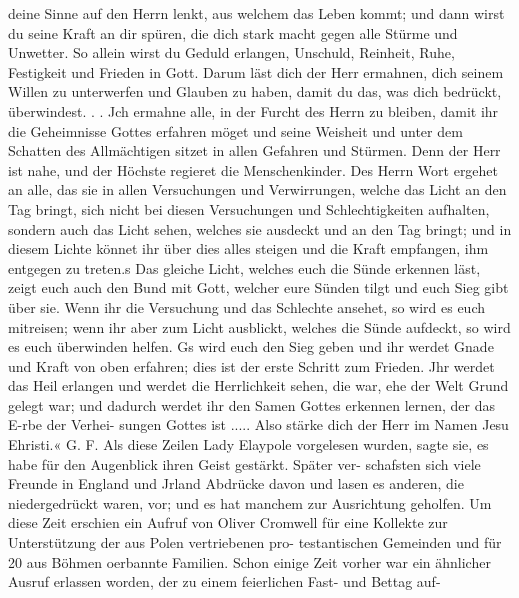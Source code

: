 deine Sinne auf den Herrn lenkt, aus welchem das Leben
kommt; und dann wirst du seine Kraft an dir spüren, die dich
stark macht gegen alle Stürme und Unwetter. So allein wirst
du Geduld erlangen, Unschuld, Reinheit, Ruhe, Festigkeit und
Frieden in Gott. Darum läst dich der Herr ermahnen, dich
seinem Willen zu unterwerfen und Glauben zu haben, damit du
das, was dich bedrückt, überwindest. .   . Jch ermahne alle,
in der Furcht des Herrn zu bleiben, damit ihr die Geheimnisse
Gottes erfahren möget und seine Weisheit und unter dem Schatten
des Allmächtigen sitzet in allen Gefahren und Stürmen. Denn
der Herr ist nahe, und der Höchste regieret die Menschenkinder.
Des Herrn Wort ergehet an alle, das sie in allen Versuchungen
und Verwirrungen, welche das Licht an den Tag bringt, sich nicht
bei diesen Versuchungen und Schlechtigkeiten aufhalten, sondern
auch das Licht sehen, welches sie ausdeckt und an den Tag
bringt; und in diesem Lichte könnet ihr über dies alles steigen
und die Kraft empfangen, ihm entgegen zu treten.s Das gleiche
Licht, welches euch die Sünde erkennen läst, zeigt euch auch den
Bund mit Gott, welcher eure Sünden tilgt und euch Sieg gibt
über sie.   Wenn ihr die Versuchung und das Schlechte ansehet,
so wird es euch mitreisen; wenn ihr aber zum Licht ausblickt,
welches die Sünde aufdeckt, so wird es euch überwinden helfen.
Gs wird euch den Sieg geben und ihr werdet Gnade und Kraft
von oben erfahren; dies ist der erste Schritt zum Frieden. Jhr
werdet das Heil erlangen und werdet die Herrlichkeit sehen, die
war, ehe der Welt Grund gelegt war; und dadurch werdet ihr
den Samen Gottes erkennen lernen, der das E-rbe der Verhei-
sungen Gottes ist ..... Also stärke dich der Herr im Namen
Jesu Ehristi.« G. F.
Als diese Zeilen Lady Elaypole vorgelesen wurden, sagte sie,
es habe für den Augenblick ihren Geist gestärkt. Später ver-
schafsten sich viele Freunde in England und Jrland Abdrücke
davon und lasen es anderen, die niedergedrückt waren, vor; und
es hat manchem zur Ausrichtung geholfen.
Um diese Zeit erschien ein Aufruf von Oliver Cromwell für
eine Kollekte zur Unterstützung der aus Polen vertriebenen pro-
testantischen Gemeinden und für 20 aus Böhmen oerbannte
Familien. Schon einige Zeit vorher war ein ähnlicher Ausruf
erlassen worden, der zu einem feierlichen Fast- und Bettag auf-


